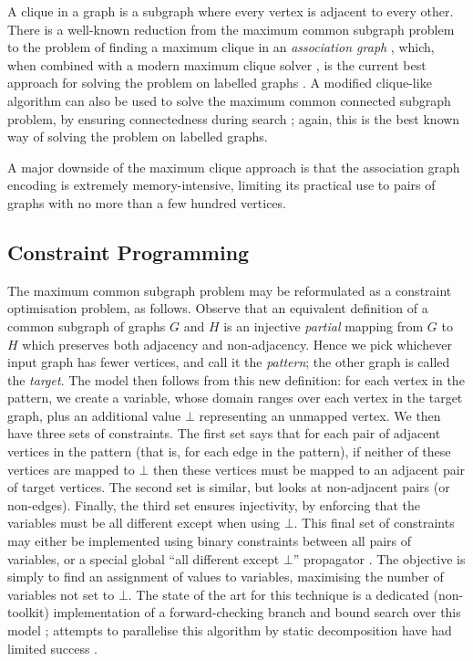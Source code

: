 \documentclass[sigconf]{acmart}
\begin{document}
A clique in a graph is a subgraph where every vertex is adjacent to every other. There is a
well-known reduction from the maximum common subgraph problem to the problem of finding a maximum
clique in an \emph{association graph}
\citep{o:Levi73,DBLP:journals/jcamd/RaymondW02a,DBLP:conf/cp/McCreeshNPS16}, which, when combined with
a modern maximum clique solver \citep{DBLP:journals/ol/SegundoMRH13}, is the current best approach for
solving the problem on labelled graphs \citep{DBLP:conf/cp/McCreeshNPS16}. A modified clique-like
algorithm can also be used to solve the maximum common connected subgraph problem, by ensuring
connectedness during search \citep{DBLP:conf/cp/McCreeshNPS16}; again, this is the best known way of
solving the problem on labelled graphs.

A major downside of the maximum clique approach is that the association graph encoding is extremely
memory-intensive, limiting its practical use to pairs of graphs with no more than a few hundred
vertices.

\subsection{Constraint Programming}

The maximum common subgraph problem may be reformulated as a constraint optimisation problem, as
follows.  Observe that an equivalent definition of a common subgraph of graphs $G$ and $H$ is an
injective \emph{partial} mapping from $G$ to $H$ which preserves both adjacency and non-adjacency.
Hence we pick whichever input graph has fewer vertices, and call it the \emph{pattern}; the other
graph is called the \emph{target}. The model then follows from this new definition: for each vertex
in the pattern, we create a variable, whose domain ranges over each vertex in the target graph, plus
an additional value $\bot$ representing an unmapped vertex. We then have three sets of constraints.
The first set says that for each pair of adjacent vertices in the pattern (that is, for each edge in
the pattern), if neither of these vertices are mapped to $\bot$ then these vertices must be mapped
to an adjacent pair of target vertices. The second set is similar, but looks at non-adjacent pairs
(or non-edges).  Finally, the third set ensures injectivity, by enforcing that the variables must be
all different except when using $\bot$. This final set of constraints may either be implemented
using binary constraints between all pairs of variables, or a special global ``all different except
$\bot$'' propagator \citep{DBLP:conf/cp/PetitRB01}. The objective is simply to find an assignment of
values to variables, maximising the number of variables not set to $\bot$. The state of the art for
this technique is a dedicated (non-toolkit) implementation of a forward-checking branch and bound
search over this
model \citep{DBLP:conf/cp/NdiayeS11,DBLP:conf/cp/McCreeshNPS16}; attempts to parallelise this
algorithm by static decomposition have had limited success \citep{DBLP:conf/ictai/MinotNS15}.
\end{document}
